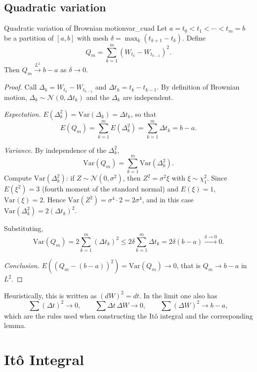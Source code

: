 \documentclass[11pt, a4paper]{article}
\begin{document}
\subsection{Quadratic variation}

\begin{teorema}{Quadratic variation of Brownian motion}{var_cuad}
Let $a = t_0 < t_1 < \cdots < t_m = b$ be a partition of $[a, b]$ with mesh
$\delta = \max_k (t_{k+1} - t_k)$. Define
$$ Q_m = \sum_{k=1}^m (W_{t_k} - W_{t_{k-1}})^2. $$
Then $Q_m \xrightarrow{L^2} b - a$ as $\delta \to 0$.
\end{teorema}

\begin{proof}
Call $\Delta_k = W_{t_k} - W_{t_{k-1}}$ and $\Delta t_k = t_k - t_{k-1}$. By definition of
Brownian motion, $\Delta_k \sim \mathcal{N}(0, \Delta t_k)$ and the $\Delta_k$ are independent.

\textit{Expectation.} $E(\Delta_k^2) = \mathrm{Var}(\Delta_k) = \Delta t_k$, so that
$$ E(Q_m) = \sum_{k=1}^m E(\Delta_k^2) = \sum_{k=1}^m \Delta t_k = b - a. $$

\textit{Variance.} By independence of the $\Delta_k^2$,
$$ \mathrm{Var}(Q_m) = \sum_{k=1}^m \mathrm{Var}(\Delta_k^2). $$
Compute $\mathrm{Var}(\Delta_k^2)$: if $Z \sim \mathcal{N}(0, \sigma^2)$, then
$Z^2 = \sigma^2
\xi$ with $\xi \sim \chi^2_1$. Since $E(\xi^2) = 3$ (fourth moment of the standard normal) and
$E(\xi) = 1$, $\mathrm{Var}(\xi) = 2$. Hence $\mathrm{Var}(Z^2) = \sigma^4 \cdot 2 = 2 \sigma^4$, and
in this case $\mathrm{Var}(\Delta_k^2) = 2 (\Delta t_k)^2$.

Substituting,
$$ \mathrm{Var}(Q_m) = 2 \sum_{k=1}^m (\Delta t_k)^2 \le 2 \delta \sum_{k=1}^m \Delta t_k =
2 \delta (b - a) \xrightarrow{\delta \to 0} 0. $$

\textit{Conclusion.} $E((Q_m - (b - a))^2) = \mathrm{Var}(Q_m) \to 0$, that is $Q_m \to b - a$
in $L^2$.
\end{proof}

\obs Heuristically, this is written as $(dW)^2 = dt$. In the limit one also has
$$ \sum (\Delta t)^2 \to 0, \qquad \sum \Delta t \, \Delta W \to 0, \qquad \sum (\Delta W)^2 \to b
- a, $$
which are the rules used when constructing the Itô integral and the corresponding lemma.

\newpage

\section{Itô Integral}
\end{document}
